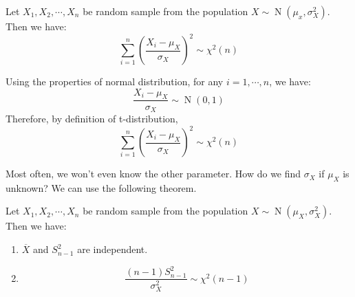 \documentclass{huhtakm-template-book}
\DeclareMathOperator{\N}{N}
\begin{document}
\begin{thm}
	\label{Chapter 7 (Theorem) Sampling distribution with known mean}
	Let $X_{1},X_{2},\cdots,X_{n}$ be random sample from the population $X\sim\N(\mu_{x},\sigma_{X}^{2})$. Then we have:
	\begin{equation*}
		\sum_{i=1}^{n}\left(\frac{X_{i}-\mu_{X}}{\sigma_{X}}\right)^{2}\sim\chi^{2}(n)
	\end{equation*}
\end{thm}
\begin{proofing}
	Using the properties of normal distribution, for any $i=1,\cdots,n$, we have:
	\begin{equation*}
		\frac{X_{i}-\mu_{X}}{\sigma_{X}}\sim\N(0,1)
	\end{equation*}
	Therefore, by definition of t-distribution,
	\begin{equation*}
		\sum_{i=1}^{n}\left(\frac{X_{i}-\mu_{X}}{\sigma_{X}}\right)^{2}\sim\chi^{2}(n)
	\end{equation*}
\end{proofing}
Most often, we won't even know the other parameter. How do we find $\sigma_{X}$ if $\mu_{X}$ is unknown? We can use the following theorem.
\begin{thm}
	\label{Chapter 7 (Theorem) Sampling distribution with sample variance}
	Let $X_{1},X_{2},\cdots,X_{n}$ be random sample from the population $X\sim\N(\mu_{X},\sigma_{X}^{2})$. Then we have:
	\begin{enumerate}
		\item $\overline{X}$ and $S_{n-1}^{2}$ are independent.
		\item \begin{equation*}
			\frac{(n-1)S_{n-1}^{2}}{\sigma_{X}^{2}}\sim\chi^{2}(n-1)
		\end{equation*}
	\end{enumerate}
\end{thm}
\end{document}
